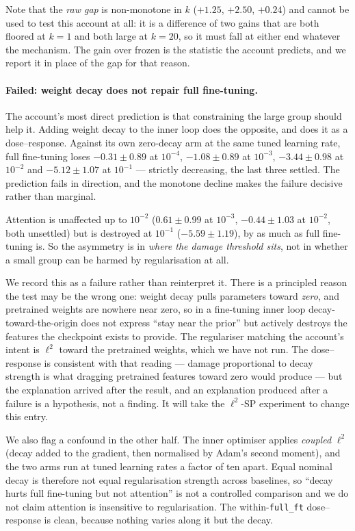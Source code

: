 \documentclass[11pt]{article}
\newcommand{\dd}[2]{$#1 \pm #2$}
\begin{document}
Note that the \emph{raw gap} is non-monotone in $k$ ($+1.25$, $+2.50$, $+0.24$) and
cannot be used to test this account at all: it is a difference of two gains that are
both floored at $k=1$ and both large at $k=20$, so it must fall at either end whatever
the mechanism. The gain over frozen is the statistic the account predicts, and we report
it in place of the gap for that reason.

\paragraph{Failed: weight decay does not repair full fine-tuning.}
The account's most direct prediction is that constraining the large group should help
it. Adding weight decay to the inner loop does the opposite, and does it as a
dose--response. Against its own zero-decay arm at the same tuned learning rate, full
fine-tuning loses \dd{-0.31}{0.89} at $10^{-4}$, \dd{-1.08}{0.89} at $10^{-3}$,
\dd{-3.44}{0.98} at $10^{-2}$ and \dd{-5.12}{1.07} at $10^{-1}$ --- strictly
decreasing, the last three settled. The prediction fails in direction, and the monotone
decline makes the failure decisive rather than marginal.

Attention is unaffected up to $10^{-2}$ (\dd{0.61}{0.99} at $10^{-3}$, \dd{-0.44}{1.03}
at $10^{-2}$, both unsettled) but is destroyed at $10^{-1}$ (\dd{-5.59}{1.19}), by as
much as full fine-tuning is. So the asymmetry is in \emph{where the damage threshold
sits}, not in whether a small group can be harmed by regularisation at all.

We record this as a failure rather than reinterpret it. There is a principled reason the
test may be the wrong one: weight decay pulls parameters toward \emph{zero}, and
pretrained weights are nowhere near zero, so in a fine-tuning inner loop
decay-toward-the-origin does not express ``stay near the prior'' but actively destroys
the features the checkpoint exists to provide. The regulariser matching the account's
intent is $\ell^2$ toward the pretrained weights, which we have not run. The
dose--response is consistent with that reading --- damage proportional to decay
strength is what dragging pretrained features toward zero would produce --- but the
explanation arrived after the result, and an explanation produced after a failure is a
hypothesis, not a finding. It will take the $\ell^2$-SP experiment to change this entry.

We also flag a confound in the other half. The inner optimiser applies \emph{coupled}
$\ell^2$ (decay added to the gradient, then normalised by Adam's second moment), and
the two arms run at tuned learning rates a factor of ten apart. Equal nominal decay is
therefore not equal regularisation strength across baselines, so ``decay hurts full
fine-tuning but not attention'' is not a controlled comparison and we do not claim
attention is insensitive to regularisation. The within-\texttt{full\_ft}
dose--response is clean, because nothing varies along it but the decay.
\end{document}
